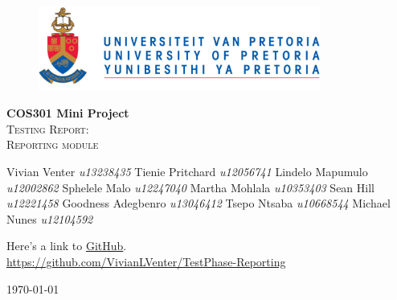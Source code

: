 \begin{titlepage}
	\begin{center}
		
		\begin{figure}[t]
			\centering
			\includegraphics[width=350px]{images/UP_Logo.png}
		\end{figure}
		
		\textbf{\Large COS301 Mini Project } \\
		\textsc{\Large Testing Report:  } \\
		\textsc{\Large Reporting module } \\
		
		\begin{flushright} \large
			Vivian Venter 		\emph{u13238435} \newline
			Tienie Pritchard 	\emph{u12056741} \newline
			Lindelo Mapumulo	\emph{u12002862} \newline
			Sphelele Malo 		\emph{u12247040} \newline
			Martha Mohlala 		\emph{u10353403} \newline
			Sean Hill			\emph{u12221458} \newline
			Goodness Adegbenro	\emph{u13046412} \newline
			Tsepo Ntsaba 		\emph{u10668544} \newline
			Michael Nunes 		\emph{u12104592} \newline
		\end{flushright}
		
		\vfill
		
	Here's a link to \href{https://github.com/VivianLVenter/TestPhase-Reporting}{GitHub}.\\
	\url{https://github.com/VivianLVenter/TestPhase-Reporting}

	\vfill

	{\large \today}		
		
		
	\end{center}
\end{titlepage}
